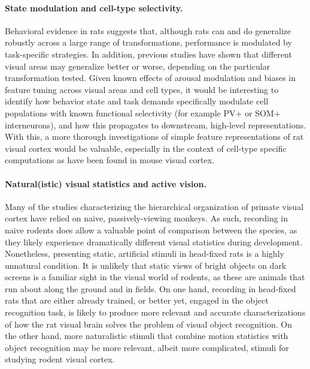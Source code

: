\paragraph{State modulation and cell-type selectivity.} Behavioral evidence in rats suggests that, although rats can and do generalize robustly across a large range of transformations, performance is modulated by task-specific strategies\cite{Djurdjevic2018,Masis2020}. In addition, previous studies have shown that different visual areas may generalize better or worse, depending on the particular transformation tested\cite{Vermaercke2014, Tafazoli2017, Froudarakis2020}. Given known effects of arousal modulation and biases in feature tuning across visual areas and cell types, it would be interesting to identify how behavior state and task demands specifically modulate cell populations with known functional selectivity (for example PV+ or SOM+ interneurons), and how this propagates to downstream, high-level representations. With this, a more thorough investigations of simple feature representations of rat visual cortex would be valuable, especially in the context of cell-type specific computations as have been found in mouse visual cortex.

\paragraph{Natural(istic) visual statistics and active vision.} Many of the studies characterizing the hierarchical organization of primate visual cortex have relied on naive, passively-viewing monkeys. As such, recording in naive rodents does allow a valuable point of comparison between the species, as they likely experience dramatically different visual statistics during development. Nonetheless, presenting static, artificial stimuli in head-fixed rats is a highly unnatural condition. It is unlikely that static views of bright objects on dark screens is a familiar sight in the visual world of rodents, as these are animals that run about along the ground and in fields. On one hand, recording in head-fixed rats that are either already trained, or better yet, engaged in the object recognition task, is likely to produce more relevant and accurate characterizations of how the rat visual brain solves the problem of visual object recognition. On the other hand, more naturalistic stimuli that combine motion statistics with object recognition may be more relevant, albeit more complicated, stimuli for studying rodent visual cortex.

